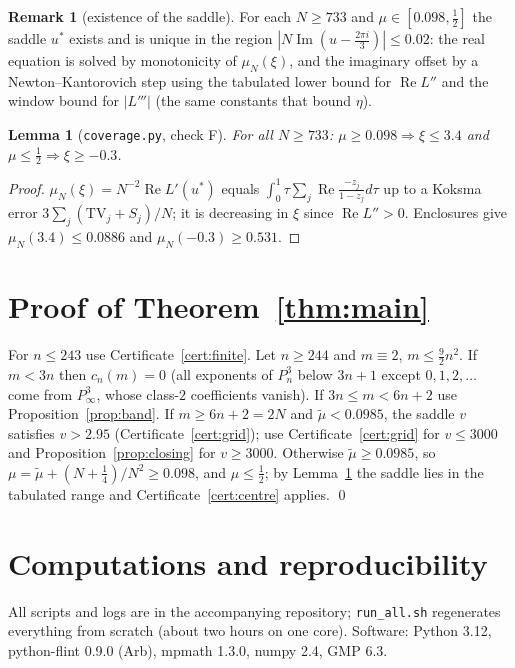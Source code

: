 \documentclass[11pt,reqno]{amsart}
\theoremstyle{plain}
\newtheorem{lemma}[theorem]{Lemma}
\theoremstyle{definition}
\newtheorem{remark}[theorem]{Remark}
\renewcommand{\Re}{\operatorname{Re}}
\renewcommand{\Im}{\operatorname{Im}}
\begin{document}
\begin{remark}[existence of the saddle]
For each $N\ge733$ and $\mu\in[0.098,\frac12]$ the saddle $u^*$ exists and is unique in the region $|N\Im(u-\frac{2\pi i}3)|\le0.02$:
the real equation is solved by monotonicity of $\mu_N(\xi)$, and the imaginary offset by a Newton--Kantorovich step using the tabulated
lower bound for $\Re L''$ and the window bound for $|L'''|$ (the same constants that bound $\eta$).
\end{remark}

\begin{lemma}[\texttt{coverage.py}, check F]\label{lem:xirange}
For all $N\ge733$: $\mu\ge0.098\Rightarrow\xi\le3.4$ and $\mu\le\frac12\Rightarrow\xi\ge-0.3$.
\end{lemma}
\begin{proof}
$\mu_N(\xi)=N^{-2}\Re L'(u^*)$ equals $\int_0^1\tau\sum_j\Re\frac{-z_j}{1-z_j}d\tau$ up to a Koksma error $3\sum_j(\mathrm{TV}_j+S_j)/N$; it is
decreasing in $\xi$ since $\Re L''>0$. Enclosures give $\mu_N(3.4)\le0.0886$ and $\mu_N(-0.3)\ge0.531$.
\end{proof}

\section{Proof of Theorem~\ref{thm:main}}\label{sec:proofmain}
For $n\le243$ use Certificate~\ref{cert:finite}. Let $n\ge244$ and $m\equiv2$, $m\le\frac92n^2$. If $m<3n$ then $c_n(m)=0$ (all
exponents of $P_n^3$ below $3n+1$ except $0,1,2,\dots$ come from $P_\infty^3$, whose class-$2$ coefficients vanish). If $3n\le m<6n+2$
use Proposition~\ref{prop:band}. If $m\ge6n+2=2N$ and $\tilde\mu<0.0985$, the saddle $v$ satisfies $v>2.95$ (Certificate~\ref{cert:grid});
use Certificate~\ref{cert:grid} for $v\le3000$ and Proposition~\ref{prop:closing} for $v\ge3000$. Otherwise $\tilde\mu\ge0.0985$, so
$\mu=\tilde\mu+(N+\frac14)/N^2\ge0.098$, and $\mu\le\frac12$; by Lemma~\ref{lem:xirange} the saddle lies in the tabulated range and
Certificate~\ref{cert:centre} applies. \qed

\section{Computations and reproducibility}\label{sec:computations}
All scripts and logs are in the accompanying repository; \texttt{run\_all.sh} regenerates everything from scratch (about two
hours on one core). Software: Python 3.12, python-flint 0.9.0 (Arb), mpmath 1.3.0, numpy 2.4, GMP 6.3.
\end{document}
